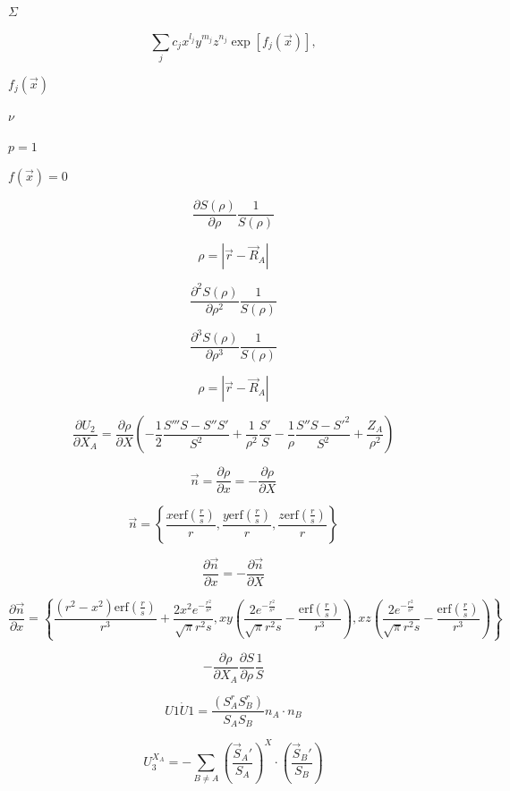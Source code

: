 \documentclass{article}
\begin{document}
$\Sigma$
\pagebreak

\[
\sum_j c_j x^{l_j} y^{m_j} z^{n_j} \exp[f_j(\vec{x})],
\]
\pagebreak

$f_j(\vec{x})$
\pagebreak

$\nu$
\pagebreak

$p=1$
\pagebreak

$f(\vec{x})=0$
\pagebreak

\[
    \frac{\partial S(\rho)}{\partial \rho} \frac{1}{S(\rho)}
\]
\pagebreak

\[
   \rho = |\vec r - \vec R_A |
\]
\pagebreak

\[
    \frac{\partial^2 S(\rho)}{\partial \rho^2} \frac{1}{S(\rho)}
\]
\pagebreak

\[
    \frac{\partial^3 S(\rho)}{\partial \rho^3} \frac{1}{S(\rho)}
\]
\pagebreak

\[
  \rho = \left| \vec r- \vec R_A \right|
\]
\pagebreak

\[
\frac{\partial U_2}{\partial X_A} = \frac{\partial \rho}{\partial X}
          \left(-\frac{1}{2}\frac{S''' S - S'' S'}{S^2} + \frac{1}{\rho^2}\frac{S'}{S}
          - \frac{1}{\rho} \frac{S''S - S'^2}{S^2} + \frac{Z_A}{\rho^2}\right)
\]
\pagebreak

\[
    \vec n  = \frac{\partial \rho}{\partial x} = -\frac{\partial \rho}{\partial X}
\]
\pagebreak

\[
\vec n = \left\{\frac{x \mathrm{erf}\left(\frac{r}{s}\right)}{r},
         \frac{y \mathrm{erf}\left(\frac{r}{s}\right)}{r},
         \frac{z \mathrm{erf}\left(\frac{r}{s}\right)}{r}\right\}
\]
\pagebreak

\[
    \frac{\partial \vec n}{\partial x}  = -\frac{\partial \vec n}{\partial X}
\]
\pagebreak

\[
\frac{\partial\vec n}{\partial x} =
\left\{\frac{\left(r^2-x^2\right) \mathrm{erf}\left(\frac{r}{s}\right)}{r^3}
   +\frac{2 x^2 e^{-\frac{r^2}{s^2}}}{\sqrt{\pi } r^2 s},
 x y \left(\frac{2 e^{-\frac{r^2}{s^2}}}{\sqrt{\pi } r^2 s}
   -\frac{\mathrm{erf}\left(\frac{r}{s}\right)}{r^3}\right),
 x z \left(\frac{2 e^{-\frac{r^2}{s^2}}}{\sqrt{\pi } r^2 s}
   -\frac{\mathrm{erf}\left(\frac{r}{s}\right)}{r^3}\right)\right\}
\]
\pagebreak

\[
 -\frac{\partial \rho}{\partial X_A}\frac{\partial S}{\partial \rho}\frac{1}{S}
\]
\pagebreak

\[
 U1\dot U1 = \frac{\left(S^r_A S^r_B\right)}{S_A S_B} n_A \cdot n_B
\]
\pagebreak

\[
U_3^{X_A} = -\sum_{B\neq A}\left(\frac{\vec S_A'}{S_A}\right)^X\cdot\left(\frac{\vec S_B'}{S_B}\right)
\]
\pagebreak
\end{document}
